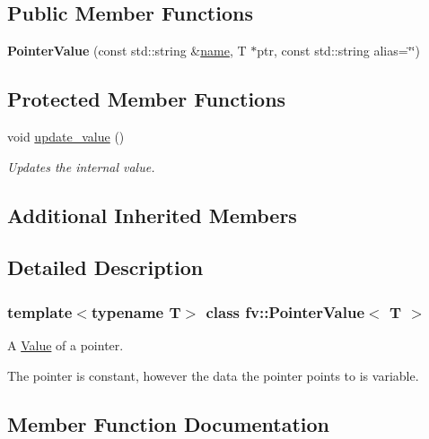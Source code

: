 \subsection*{Public Member Functions}
\begin{DoxyCompactItemize}
\item 
\hypertarget{classfv_1_1PointerValue_a73dae0d636ddd8b56c57b30759226e74}{}\label{classfv_1_1PointerValue_a73dae0d636ddd8b56c57b30759226e74} 
{\bfseries Pointer\+Value} (const std\+::string \&\hyperlink{classfv_1_1GenValue_a610f89ee441eaad4c9e78f74d6bde93b}{name}, T $\ast$ptr, const std\+::string alias=\char`\"{}\char`\"{})
\end{DoxyCompactItemize}
\subsection*{Protected Member Functions}
\begin{DoxyCompactItemize}
\item 
void \hyperlink{classfv_1_1PointerValue_a81e39d040919be39c37f845a27343f3e}{update\+\_\+value} ()
\begin{DoxyCompactList}\small\item\em Updates the internal value. \end{DoxyCompactList}\end{DoxyCompactItemize}
\subsection*{Additional Inherited Members}


\subsection{Detailed Description}
\subsubsection*{template$<$typename T$>$\newline
class fv\+::\+Pointer\+Value$<$ T $>$}

A \hyperlink{classfv_1_1Value}{Value} of a pointer. 

The pointer is constant, however the data the pointer points to is variable. 

\subsection{Member Function Documentation}
\hypertarget{classfv_1_1PointerValue_a81e39d040919be39c37f845a27343f3e}{}\label{classfv_1_1PointerValue_a81e39d040919be39c37f845a27343f3e} 
